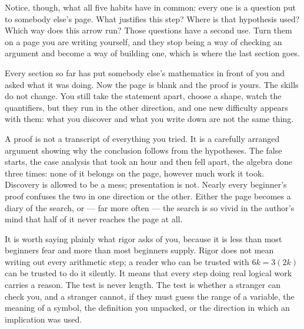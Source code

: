 \documentclass[a4paper,12pt,oneside]{memoir}
\begin{document}
Notice, though, what all five habits have in common: every one is a question put to somebody else’s page. What justifies this step? Where is that hypothesis used? Which way does this arrow run? Those questions have a second use. Turn them on a page you are writing yourself, and they stop being a way of checking an argument and become a way of building one, which is where the last section goes.


Every section so far has put somebody else’s mathematics in front of you and asked what it was doing. Now the page is blank and the proof is yours. The skills do not change. You still take the statement apart, choose a shape, watch the quantifiers, but they run in the other direction, and one new difficulty appears with them: what you discover and what you write down are not the same thing.

A proof is not a transcript of everything you tried. It is a carefully arranged argument showing why the conclusion follows from the hypotheses. The false starts, the case analysis that took an hour and then fell apart, the algebra done three times: none of it belongs on the page, however much work it took. Discovery is allowed to be a mess; presentation is not. Nearly every beginner’s proof confuses the two in one direction or the other. Either the page becomes a diary of the search, or — far more often — the search is so vivid in the author’s mind that half of it never reaches the page at all.

It is worth saying plainly what rigor asks of you, because it is less than most beginners fear and more than most beginners supply. Rigor does not mean writing out every arithmetic step; a reader who can be trusted with \(6k = 3(2k)\) can be trusted to do it silently. It means that every step doing real logical work carries a reason. The test is never length. The test is whether a stranger can check you, and a stranger cannot, if they must guess the range of a variable, the meaning of a symbol, the definition you unpacked, or the direction in which an implication was used.
\end{document}
